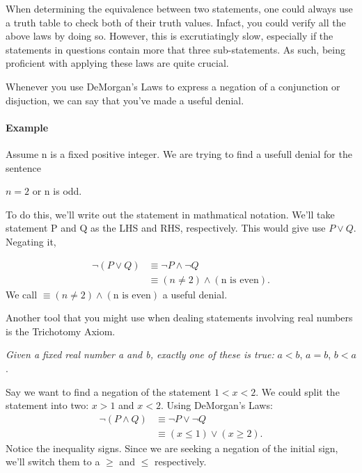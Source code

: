 \documentclass[a4paper]{article}
\begin{document}
When determining the equivalence between two statements, one could always use a truth table to check both of their truth values. Infact, you could verify all the above laws by doing so. However, this is excrutiatingly slow, especially if the statements in questions contain more that three sub-statements. As such, being proficient with applying these laws are quite crucial.

Whenever you use DeMorgan's Laws to express a negation of a conjunction or disjuction, we can say that you've made a useful denial. 

\paragraph{Example} Assume n is a fixed positive integer. We are trying to find a usefull denial for the sentence 

\begin{center}
	$n = 2$ or n is odd.
\end{center}

To do this, we'll write out the statement in mathmatical notation. We'll take statement P and Q as the LHS and RHS, respectively. This would give use $P \vee Q$. Negating it,

\begin{align*}
	\neg \left(P \vee Q \right) &\equiv \neg P \wedge \neg Q \\
				    &\equiv \left( n \not = 2 \right) \wedge \left(\text{n is even} \right)   
.\end{align*}
We call $\equiv \left( n \not = 2 \right) \wedge \left(\text{n is even} \right)$ a useful denial. 


Another tool that you might use when dealing statements involving real numbers is the Trichotomy Axiom.
\begin{tcolorbox}[title=Trichotomy Axiom]
	\textit{Given a fixed real number a and b, exactly one of these is true:} $a < b$,  $a = b$,  $b< a$.
\end{tcolorbox}
Say we want to find a negation of the statement $1 < x < 2$. We could split the statement into two:  $x > 1$ and  $x < 2$. Using DeMorgan's Laws:
 \begin{align*}
	 \neg \left( P \wedge Q \right) &\equiv \neg P \vee \neg Q \\
					&\equiv \left( x \le 1 \right) \vee\left( x \ge 2 \right)  
.\end{align*}
Notice the inequality signs. Since we are seeking a negation of the initial sign, we'll switch them to a $\ge$ and $\le$ respectively. 
\end{document}
